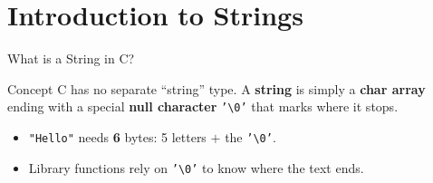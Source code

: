 \documentclass[aspectratio=169]{beamer}
\begin{document}
	\section{Introduction to Strings}
	\begin{frame}{What is a String in C?}
		\begin{block}{Concept}
			C has no separate ``string'' type. A \textbf{string} is simply a \textbf{char array}
			ending with a special \textbf{null character} \texttt{'\textbackslash 0'} that marks where it stops.
		\end{block}
		\vspace{0.1cm}
		\centering
		\vspace{0.15cm}
		\begin{itemize}\small
			\item \texttt{"Hello"} needs \textbf{6} bytes: 5 letters $+$ the \texttt{'\textbackslash 0'}.
			\item Library functions rely on \texttt{'\textbackslash 0'} to know where the text ends.
		\end{itemize}
	\end{frame}
\end{document}
